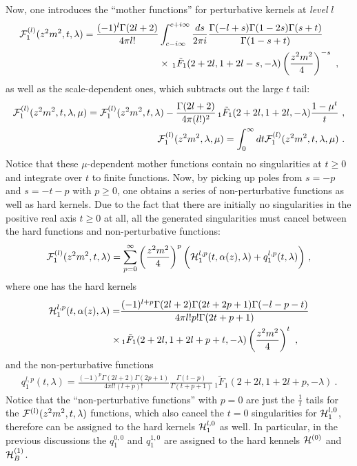 \documentclass[a4paper,11pt]{article}
\begin{document}
Now, one introduces the ``mother functions'' for perturbative kernels at {\it level} $l$ 
\begin{align}\label{eq:motherlF1}
{\cal F}_1^{(l)}(z^2m^2,t,\lambda)=\frac{(-1)^l\Gamma(2l+2)}{4\pi l!}&\int_{c-i\infty}^{c+i\infty}\frac{ds}{2\pi i}\frac{\Gamma(-l+s)\Gamma(1-2s)\Gamma(s+t)}{\Gamma(1-s+t)}\nonumber \\ & \times \,_1\tilde F_1(2+2l
,1+2l-s,-\lambda)\left(\frac{z^2m^2}{4}\right)^{-s} \ ,
\end{align}
as well as the scale-dependent ones, which subtracts out the large $t$ tail:
\begin{align}
{\cal F}_1^{(l)}(z^2m^2,t,\lambda,\mu)={\cal F}_1^{(l)}(z^2m^2,t,\lambda)-\frac{\Gamma(2l+2)}{4\pi (l!)^2}\,_1\tilde F_1(2+2l,1+2l,-\lambda)\frac{1-\mu^t}{t} \ , \\ 
{\cal F}_1^{(l)}(z^2m^2,\lambda,\mu)=\int_{0}^{\infty} dt {\cal F}_1^{(l)}(z^2m^2,t,\lambda,\mu)  \ .\label{eq:motherF1mu}
\end{align}
Notice that these $\mu$-dependent mother functions contain no singularities at $t\ge 0$ and integrate over $t$ to finite functions. Now, by picking up poles from $s=-p$ and $s=-t-p$ with $p\ge 0$, one obtains a series of non-perturbative functions as well as hard kernels. Due to the fact that there are initially no singularities in the positive real axis $t\ge 0$ at all, all the generated singularities must cancel between the hard functions and non-perturbative functions:
\begin{align}
{\cal F}_1^{(l)}(z^2m^2,t,\lambda)=\sum_{p=0}^{\infty}\left(\frac{z^2m^2}{4}\right)^{p}\bigg({\cal H}_1^{l,p}(t,\alpha(z),\lambda)+q_{1}^{l,p}(t,\lambda)\bigg) \ ,
\end{align}
where one has the hard kernels
\begin{align}\label{eq:H1lp}
{\cal H}_1^{l,p}(t,\alpha(z),\lambda)= &\frac{(-1)^{l+p} \Gamma (2 l+2) \Gamma (2t+2p+1) \Gamma (-l-p-t)}{4 \pi  l! p!  \Gamma (2 t+p+1)} \nonumber \\ \times &\,_1\tilde F_1(2+2l,1+2l+p+t,-\lambda)\left(\frac{z^2m^2}{4}\right)^t \ , 
\end{align}
and the non-perturbative functions
\begin{align}\label{eq:q1lp}
q_1^{l,p}(t,\lambda)=\frac{(-1)^{p} \Gamma (2 l+2) \Gamma (2 p+1) }{4 \pi  l! (l+p)! }\frac{\Gamma(t-p)}{\Gamma(t+p+1)}\,_1\tilde F_1(2+2l,1+2l+p,-\lambda) \ .
\end{align}
Notice that the ``non-perturbative functions'' with $p=0$ are just the 
$\frac{1}{t}$ tails for the ${\cal F}^{(l)}(z^2m^2,t,\lambda)$ functions, which also cancel the $t=0$ singularities for ${\cal H}^{l,0}_1$, therefore can be assigned to the hard kernels ${\cal H}_1^{l,0}$ as well. In particular, in the previous discussions the $q_1^{0,0}$ and $q_1^{1,0}$ are assigned to the hard kennels ${\cal H}^{(0)}$ and ${\cal H}^{(1)}_B$.  
\end{document}
